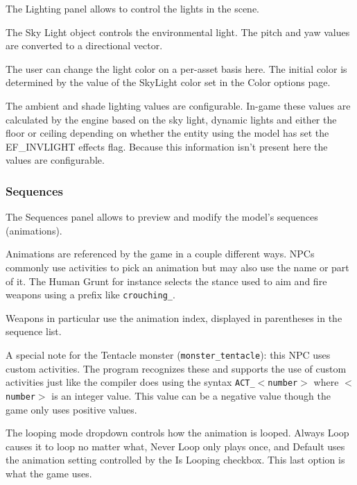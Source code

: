 \documentclass[10pt, a4paper, titlepage, oneside]{article}
\newcommand{\code}[1]{\mbox{\texttt{#1}}}
\begin{document}
The Lighting panel allows to control the lights in the scene.

\vspace{\baselineskip}
The Sky Light object controls the environmental light. The pitch and yaw values are converted to a directional vector.

\vspace{\baselineskip}
The user can change the light color on a per-asset basis here. The initial color is determined by the value of the SkyLight color set in the Color options page.

\vspace{\baselineskip}
The ambient and shade lighting values are configurable. In-game these values are calculated by the engine based on the sky light, dynamic lights and either the floor or ceiling depending on whether the entity using the model has set the EF\_INVLIGHT effects flag. Because this information isn't present here the values are configurable.

\newpage

\subsubsection{Sequences}

The Sequences panel allows to preview and modify the model's sequences (animations).

\vspace{\baselineskip}
Animations are referenced by the game in a couple different ways. NPCs commonly use activities to pick an animation but may also use the name or part of it. The Human Grunt for instance selects the stance used to aim and fire weapons using a prefix like \code{crouching\_}.

\vspace{\baselineskip}
Weapons in particular use the animation index, displayed in parentheses in the sequence list.

\vspace{\baselineskip}
A special note for the Tentacle monster (\code{monster\_tentacle}): this NPC uses custom activities. The program recognizes these and supports the use of custom activities just like the compiler does using the syntax \code{ACT\_$<$number$>$} where \code{$<$number$>$} is an integer value. This value can be a negative value though the game only uses positive values.

\vspace{\baselineskip}
The looping mode dropdown controls how the animation is looped. Always Loop causes it to loop no matter what, Never Loop only plays once, and Default uses the animation setting controlled by the Is Looping checkbox. This last option is what the game uses.
\end{document}
